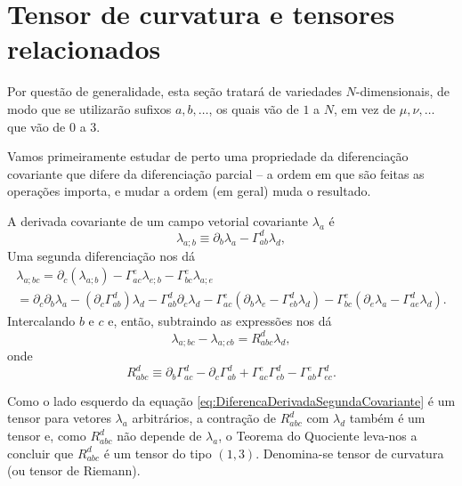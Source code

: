 \section{Tensor de curvatura e tensores relacionados}\label{sec:TensorCurvatura}

Por questão de generalidade, esta seção tratará de variedades $N$-dimensionais, de modo que se utilizarão sufixos $a,b,\dots$, os quais vão de $1$ a $N$, em vez de $\mu,\nu,\dots$ que vão de $0$ a $3$. 

Vamos primeiramente estudar de perto uma propriedade da diferenciação covariante que difere da diferenciação parcial -- a ordem em que são feitas as operações importa, e mudar a ordem (em geral) muda o resultado.

A derivada covariante de um campo vetorial covariante $\lambda_a$ é
\[
\lambda_{a ; b} \equiv \partial_{b} \lambda_{a}-\Gamma_{a b}^{d} \lambda_{d},
\]
Uma segunda diferenciação nos dá 
\[
\begin{array}{c}{\lambda_{a ; b c}=\partial_{c}\left(\lambda_{a ; b}\right)-\Gamma_{a c}^{e} \lambda_{e ; b}-\Gamma_{b c}^{e} \lambda_{a ; e}} \\ {=\partial_{c} \partial_{b} \lambda_{a}-\left(\partial_{c} \Gamma_{a b}^{d}\right) \lambda_{d}-\Gamma_{a b}^{d} \partial_{c} \lambda_{d}-\Gamma_{a c}^{e}\left(\partial_{b} \lambda_{e}-\Gamma_{e b}^{d} \lambda_{d}\right)-\Gamma_{b c}^{e}\left(\partial_{e} \lambda_{a}-\Gamma_{a e}^{d} \lambda_{d}\right).}\end{array}
\]
Intercalando $b$ e $c$ e, então, subtraindo as expressões nos dá
\begin{equation}\label{eq:DiferencaDerivadaSegundaCovariante}
	\lambda_{a;bc}-\lambda_{a;cb}=R^d_{abc}\lambda_d,
\end{equation}
onde 
\begin{equation}\label{eq:DefinicaoTensorRiemann}
	\boxed{
		R_{a b c}^{d} \equiv \partial_{b} \Gamma_{a c}^{d}-\partial_{c} \Gamma_{a b}^{d}+\Gamma_{a c}^{e} \Gamma_{e b}^{d}-\Gamma_{a b}^{e} \Gamma_{e c}^{d}.
	}
\end{equation}

Como o lado esquerdo da equação \eqref{eq:DiferencaDerivadaSegundaCovariante} é um tensor para vetores $\lambda_a$ arbitrários, a contração de $R^d_{abc}$ com $\lambda_d$ também é um tensor e, como $R^d_{abc}$ não depende de $\lambda_a$, o Teorema do Quociente leva-nos a concluir que $R^d_{abc}$ é um tensor do tipo $(1,3)$. Denomina-se tensor de curvatura (ou tensor de Riemann).

